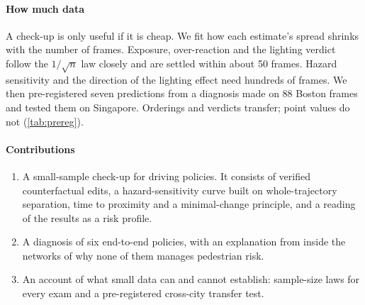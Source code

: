 \paragraph{How much data}
A check-up is only useful if it is cheap. We fit how each estimate's spread shrinks with the number of
frames. Exposure, over-reaction and the lighting verdict follow the $1/\sqrt{n}$ law closely and are
settled within about 50 frames. Hazard sensitivity and the direction of the lighting effect need
hundreds of frames. We then pre-registered seven predictions from a diagnosis made on 88 Boston frames
and tested them on Singapore. Orderings and verdicts transfer; point values do not
(\cref{tab:prereg}).

\paragraph{Contributions}
\begin{enumerate}\itemsep2pt
\item A small-sample check-up for driving policies. It consists of verified counterfactual edits, a
      hazard-sensitivity curve built on whole-trajectory separation, time to proximity and a
      minimal-change principle, and a reading of the results as a risk profile.
\item A diagnosis of six end-to-end policies, with an explanation from inside the networks of why none
      of them manages pedestrian risk.
\item An account of what small data can and cannot establish: sample-size laws for every exam and a
      pre-registered cross-city transfer test.
\end{enumerate}
